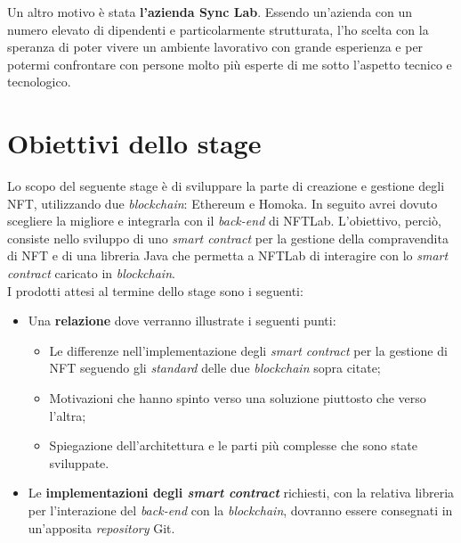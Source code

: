 Un altro motivo è stata \textbf{l'azienda Sync Lab}. Essendo un'azienda con un numero elevato di dipendenti e particolarmente strutturata, l'ho scelta con la speranza di poter vivere un ambiente lavorativo con grande esperienza e per potermi confrontare con persone molto più esperte di me sotto l'aspetto tecnico e tecnologico.


\section{Obiettivi dello stage}
Lo scopo del seguente stage è di sviluppare la parte di creazione e gestione degli NFT, utilizzando due \emph{blockchain}: Ethereum e Homoka. In seguito avrei dovuto scegliere la migliore e integrarla con il \emph{back-end} di NFTLab. L'obiettivo, perciò, consiste nello sviluppo di uno \emph{smart contract} per la gestione della compravendita di NFT e di una libreria Java che permetta a NFTLab di interagire con lo \emph{smart contract} caricato in \emph{blockchain}. \\

\noindent I prodotti attesi al termine dello stage sono i seguenti:
\begin{itemize}
  \item Una \textbf{relazione} dove verranno illustrate i seguenti punti:
  \begin{itemize}
    \item Le differenze nell'implementazione degli \emph{smart contract} per la gestione di NFT seguendo gli \emph{standard} delle due \emph{blockchain} sopra citate;
    \item Motivazioni che hanno spinto verso una soluzione piuttosto che verso l'altra;
    \item Spiegazione dell'architettura e le parti più complesse che sono state sviluppate.
  \end{itemize}
  \item Le \textbf{implementazioni degli \emph{smart contract}} richiesti, con la relativa libreria per l'interazione del \emph{back-end} con la \emph{blockchain}, dovranno essere consegnati in un'apposita \emph{repository} Git.
\end{itemize}

